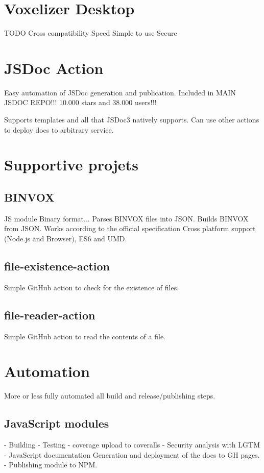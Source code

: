 \section{Voxelizer Desktop}
TODO
Cross compatibility
Speed
Simple to use
Secure

\section{JSDoc Action}
Easy automation of JSDoc generation and publication.
Included in MAIN JSDOC REPO!!! 10.000 stars and 38.000 users!!!

Supports templates and all that JSDoc3 natively supports.
Can use other actions to deploy docs to arbitrary service.


\section{Supportive projets}
\subsection{BINVOX}
JS module
Binary format...
Parses BINVOX files into JSON.
Builds BINVOX from JSON.
Works according to the official specification
Cross platform support (Node.js and Browser), ES6 and UMD. 

\subsection{file-existence-action}
Simple GitHub action to check for the existence of files.

\subsection{file-reader-action}
Simple GitHub action to read the contents of a file.

\section{Automation}
More or less fully automated all build and release/publishing steps.
\subsection{JavaScript modules}
- Building
- Testing
- coverage upload to coveralls
- Security analysis with LGTM
- JavaScript documentation Generation and deployment of the docs to GH pages.
- Publishing module to NPM.

